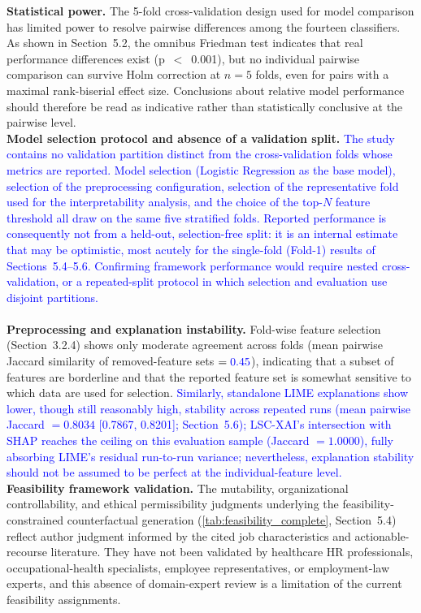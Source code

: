 \documentclass[a4paper,fleqn]{cas-sc}
\begin{document}
{{\textbf{Statistical power.} The 5-fold cross-validation design used for model comparison has limited power to resolve pairwise differences among the fourteen classifiers. As shown in Section~5.2, the omnibus Friedman test indicates that real performance differences exist (p~$<$~0.001), but no individual pairwise comparison can survive Holm correction at $n=5$ folds, even for pairs with a maximal rank-biserial effect size. Conclusions about relative model performance should therefore be read as indicative rather than statistically conclusive
at the pairwise level.\\
\textbf{Model selection protocol and absence of a validation split.} \textcolor{blue}{The study contains no validation partition distinct from the cross-validation folds whose metrics are reported. Model selection (Logistic Regression as the base model), selection of the preprocessing configuration, selection of the representative fold used for the interpretability analysis, and the choice of the top-$N$ feature threshold all draw on the same five stratified folds. Reported performance is consequently not from a held-out, selection-free split: it is an internal estimate that may be optimistic, most acutely for the single-fold (Fold-1) results of Sections~5.4--5.6. Confirming framework performance would require nested cross-validation, or a repeated-split protocol in which selection and evaluation use disjoint partitions.}\\\\
\textbf{Preprocessing and explanation instability.} Fold-wise feature selection (Section~3.2.4) shows only moderate agreement across folds (mean pairwise Jaccard similarity of removed-feature sets $=\textcolor{blue}{0.45}$), indicating that a subset of features are borderline and that the reported feature
set is somewhat sensitive to which data are used for selection. \textcolor{blue}{Similarly, standalone LIME explanations show lower, though still reasonably high, stability across repeated runs (mean pairwise Jaccard $= 0.8034$ [0.7867, 0.8201]; Section~5.6); LSC-XAI's intersection with SHAP reaches the ceiling on this evaluation sample (Jaccard $= 1.0000$), fully absorbing LIME's residual run-to-run variance; nevertheless, explanation stability should not be assumed to be perfect at the individual-feature level.}\\
\textbf{Feasibility framework validation.} The mutability, organizational controllability, and ethical permissibility judgments underlying the feasibility-constrained counterfactual generation (\cref{tab:feasibility_complete}, Section~5.4) reflect author judgment informed by the cited job characteristics and actionable-recourse literature. They have not been validated by healthcare HR professionals, occupational-health specialists, employee representatives, or employment-law experts, and this absence of domain-expert review is a limitation of the current feasibility assignments.\\
}}
\end{document}
